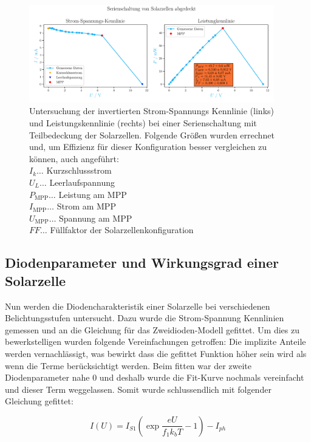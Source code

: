 \documentclass[12pt,english,ngerman]{scrartcl}
\begin{document}
\begin{figure}[H]
	\centering
	\includegraphics[width=0.95\textwidth]{figures/serienschaltungAbgedeckt.pdf}
	\caption[Kennlinien Serienschaltung mit teils bedeckten Solarzellen]{Untersuchung der
		invertierten Strom-Spannungs Kennlinie (links) und Leistungskennlinie (rechts)
		bei einer Serienschaltung mit Teilbedeckung der Solarzellen. Folgende Größen
		wurden errechnet und, um Effizienz für dieser Konfiguration besser vergleichen
		zu können, auch angeführt:           \\
		$I_k \dots$ Kurzschlussstrom         \\
		$U_L \dots$ Leerlaufspannung         \\
		$P_\text{MPP} \dots$ Leistung am MPP \\
		$I_\text{MPP} \dots$ Strom am MPP    \\
		$U_\text{MPP} \dots$ Spannung am MPP \\
		$FF \dots$ Füllfaktor der Solarzellenkonfiguration
	}\label{fig:auws_kennlinie_abgedeckt}
\end{figure}

\subsection{Diodenparameter und Wirkungsgrad einer Solarzelle}

Nun werden die Diodencharakteristik einer Solarzelle bei verschiedenen
Belichtungsstufen untersucht. Dazu wurde die Strom-Spannung Kennlinien gemessen
und an die Gleichung für das Zweidioden-Modell gefittet. Um dies zu
bewerkstelligen wurden folgende Vereinfachungen getroffen: Die implizite
Anteile werden vernachlässigt, was bewirkt dass die gefittet Funktion höher
sein wird als wenn die Terme berücksichtigt werden. Beim fitten war der zweite
Diodenparameter nahe 0 und deshalb wurde die Fit-Kurve nochmals vereinfacht und
dieser Term weggelassen. Somit wurde schlussendlich mit folgender Gleichung
gefittet:

\begin{equation}
	I(U) = I_{S1} \left( \exp{\frac{eU}{f_1 k_b T}} -1 \right) - I_{ph}
	\label{eq:kennlinienFit}
\end{equation}
\end{document}
